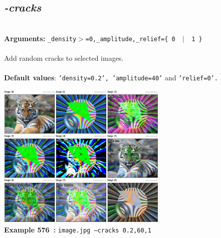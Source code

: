 \documentclass[a4paper,11pt,twoside]{book}
\begin{document}
\subsection{\emph{-cracks} }\vspace*{-0.5em}
~\\\textbf{Arguments: } 
{\small \texttt{\_density$>$=0,\_amplitude,\_relief=\{ 0 ~$|$~ 1 \}}}\\~\\
Add random cracks to selected images.
~\\~\\\textbf{Default values}: {\small \texttt{'density=0.2', 'amplitude=40'} and \texttt{'relief=0'.}}
\begin{center}\includegraphics[keepaspectratio=true,height=7cm,width=\textwidth]{img/gmic_def576.jpg}\\
{\footnotesize \textbf{Example 576~:} \texttt{image.jpg --cracks 0.2,60,1}}
\end{center}
\end{document}
